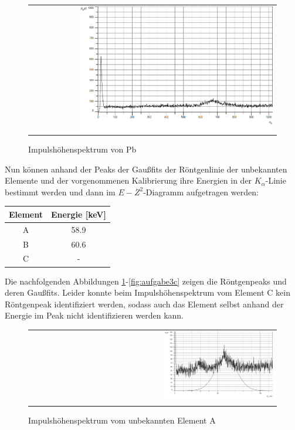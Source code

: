 \documentclass[a4paper,titlepage]{scrartcl}
\numberwithin{equation}{section}
\begin{document}
\begin{figure}[H]
		\centering
		\begin{tabular}{@{}r@{}}
			\includegraphics[width=0.8\textwidth]{bilder/aufgabe3/pb.png}\\
		\end{tabular}
		\caption{Impulshöhenspektrum von Pb}
\end{figure}
Nun können anhand der Peaks der Gaußfits der Röntgenlinie der unbekannten Elemente und der vorgenommenen Kalibrierung ihre Energien in der $K_{\alpha}$-Linie bestimmt werden und dann im $E-Z^2$-Diagramm aufgetragen werden:
\begin{table}[H]
\begin{tabular}{c|c}
	Element & Energie [keV]\\
	\hline
	A & 58.9\\
	B & 60.6\\
	C & -\\
\end{tabular}
\end{table}
Die nachfolgenden Abbildungen \ref{fig:aufgabe3a}-\ref{fig:aufgabe3c} zeigen die Röntgenpeaks und deren Gaußfits. Leider konnte beim Impulshöhenspektrum vom Element C kein Röntgenpeak identifiziert werden, sodass auch das Element selbst anhand der Energie im Peak nicht identifizieren werden kann.
\begin{figure}[H]
		\centering
		\begin{tabular}{@{}r@{}}
			\includegraphics[width=0.45\textwidth]{bilder/aufgabe3/a.png}\\
		\end{tabular}
		\caption{Impulshöhenspektrum vom unbekannten Element A}
		\label{fig:aufgabe3a}
\end{figure}
\end{document}
